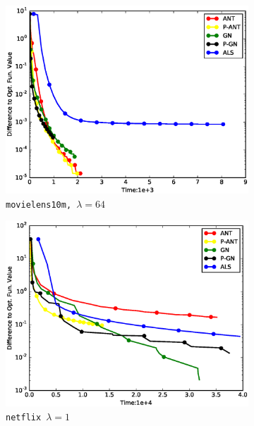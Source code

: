\documentclass[11pt,twoside]{article}
\begin{document}
\begin{figure}
\begin{subfigure}[b]{0.32\textwidth}
        \centering
        \includegraphics[width=1.03\textwidth]{./figures/ml.64.obj.eps}
        \caption{\tt movielens10m, $\lambda=64$}
    \end{subfigure}
    \begin{subfigure}[b]{0.32\textwidth}
        \centering
        \includegraphics[width=1.03\textwidth]{./figures/nf.1.obj.eps}
        \caption{\tt netflix $\lambda=1$}
    \end{subfigure}
    \begin{subfigure}[b]{0.32\textwidth}
        \centering

\end{subfigure}
\end{figure}
\end{document}

